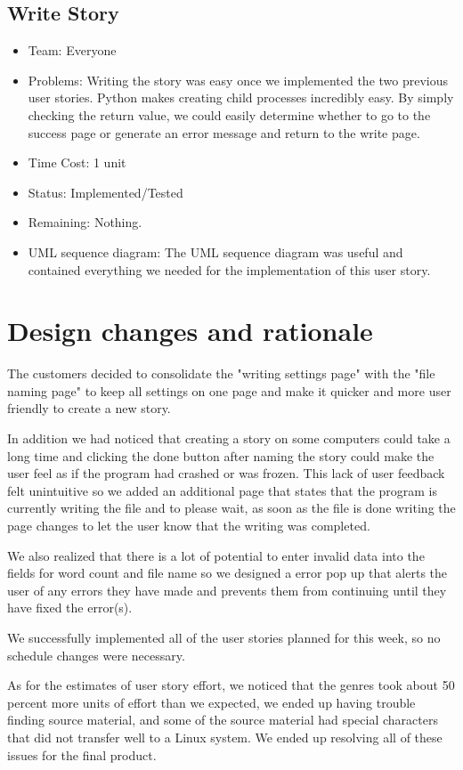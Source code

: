 \documentclass[12pt]{article}
\begin{document}
\subsection{Write Story}
\begin{itemize}
\item Team: Everyone
\item Problems: Writing the story was easy once we implemented the two previous user stories. Python makes creating child processes incredibly easy. By simply checking the return value, we could easily determine whether to go to the success page or generate an error message and return to the write page.
\item Time Cost: 1 unit 
\item Status: Implemented/Tested
\item Remaining: Nothing.
\item UML sequence diagram: The  UML sequence diagram was useful and contained everything we needed for the implementation of this user story.
\end{itemize}

\section{Design changes and rationale}

The customers decided to consolidate the "writing settings page" with the "file naming page" to keep all settings on one page and make it quicker and more user friendly to create a new story. 

In addition we had noticed that creating a story on some computers could take a long time and clicking the done button after naming the story could make the user feel as if the program had crashed or was frozen. This lack of user feedback felt unintuitive so we added an additional page that states that the program is currently writing the file and to please wait, as soon as the file is done writing the page changes to let the user know that the writing was completed.   
 
We also realized that there is a lot of potential to enter invalid data into the fields for word count and file name so we designed a error pop up that alerts the user of any errors they have made and prevents them from continuing until they have fixed the error(s).

We successfully implemented all of the user stories planned for this week, so no schedule changes were necessary.

As for the estimates of user story effort, we noticed that the genres took about 50 percent more units of effort than we expected, we ended up having trouble finding source material, and some of the source material had special characters that did not transfer well to a Linux system. We ended up resolving all of these issues for the final product. 
\end{document}
